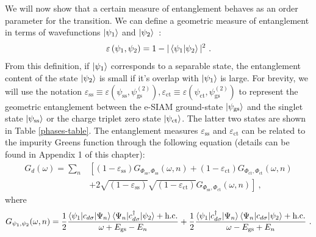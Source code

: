 We will now show that a certain measure of entanglement behaves as an order parameter for the transition. We can define a geometric measure of entanglement in terms of wavefunctions \(\ket{\psi_1}\) and \(\ket{\psi_2}\)~\cite{shimony1995degree,wei2003geometric,horodecki2009quantum}:
\begin{eqnarray}
	\varepsilon\left(\psi_1,\psi_2\right) = 1 - |\braket{\psi_1 | \psi_2}|^2~.
\end{eqnarray}
From this definition, if \(\ket{\psi_1}\) corresponds to a separable state, the entanglement content of the state \(\ket{\psi_2}\) is small if it's overlap with \(\ket{\psi_1}\) is large.
For brevity, we will use the notation \(\varepsilon_\text{ss} \equiv \varepsilon\left(\psi_\text{ss},\psi^{(2)}_\text{gs}\right), \varepsilon_\text{ct} \equiv \varepsilon\left(\psi_\text{ct},\psi^{(2)}_\text{gs}\right)\) to represent the geometric entanglement between the e-SIAM ground-state \(\ket{\psi_\text{gs}}\) and the singlet state \(\ket{\psi_\text{ss}}\) or the charge triplet zero state \(\ket{\psi_\text{ct}}\).
The latter two states are shown in Table \eqref{phases-table}.
The entanglement measures $\varepsilon_{\text{ss}}$ and $\varepsilon_{\text{ct}}$ can be related to the impurity Greens function through the following equation (details can be found in Appendix 1 of this chapter):
\begin{eqnarray}
	G_d(\omega) = \sum_n &\left[\left(1 - \varepsilon_\text{ss} \right) G_{\Phi_\text{ss},\Phi_\text{ss}}(\omega,n) + \left(1 - \varepsilon_\text{ct} \right) G_{\Phi_\text{ct},\Phi_\text{ct}}(\omega,n) \right.\nonumber \\
			     &\left.+ 2\sqrt{\left(1 - \varepsilon_\text{ss} \right)}\sqrt{\left(1 - \varepsilon_\text{ct} \right)} G_{\Phi_\text{ss},\Phi_\text{ct}}(\omega,n)\right]~,
	\label{greens-func}
\end{eqnarray}
where
\begin{eqnarray}
	G_{\psi_1,\psi_2}(\omega,n) = \frac{1}{2}\frac{\braket{\psi_1 | c_{d\sigma} | \Psi_n}\braket{\Psi_n | c^\dagger_{d\sigma} | \psi_2} + \text{h.c.}}{\omega + E_\text{gs} - E_n} + \frac{1}{2}\frac{\braket{\psi_1 | c^\dagger_{d\sigma} | \Psi_n}\braket{\Psi_n | c_{d\sigma} | \psi_2} + \text{h.c.}}{\omega - E_\text{gs} + E_n}~.
\end{eqnarray}

